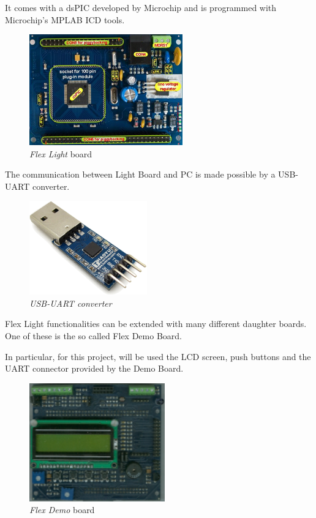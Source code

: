 \documentclass[twoside]{article}
\begin{document}
\begin{multicols}{2}
It comes with a dsPIC developed by Microchip and is programmed with Microchip's MPLAB ICD tools.

\begin{figure}[H]
  \centering
  \includegraphics[width=2.6in]{img/flex_light_presentation}
  \caption{\textit{Flex Light} board}
\end{figure}

The communication between Light Board and PC is made possible by a USB-UART converter.

\begin{figure}[H]
  \centering
  \includegraphics[width=2in]{img/usb_uart_presentation}
  \caption{\textit{USB-UART converter}}
\end{figure}

Flex Light functionalities can be extended with many different daughter boards.
One of these is the so called Flex Demo Board.

In particular, for this project, will be used the LCD screen, push buttons and the UART connector provided by the Demo Board.

\begin{figure}[H]
  \centering
  \includegraphics[width=2.3in]{img/flex_demo_board_presentation}
  \caption{\textit{Flex Demo} board}
\end{figure}


\end{multicols}
\end{document}
